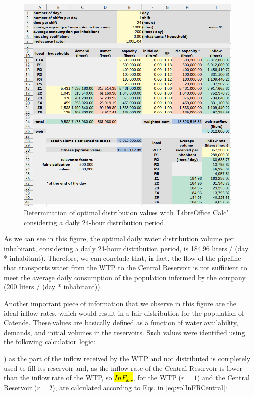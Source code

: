 \documentclass{singlecol}
\theoremstyle{TH}{
\newtheorem{lemma}{Lemma}
\newtheorem{theorem}[lemma]{Theorem}
\newtheorem{corrolary}[lemma]{Corrolary}
\newtheorem{conjecture}[lemma]{Conjecture}
\newtheorem{proposition}[lemma]{Proposition}
\newtheorem{claim}[lemma]{Claim}
\newtheorem{stheorem}[lemma]{Wrong Theorem}
\newtheorem{algorithm}{Algorithm}
}
\theoremstyle{THrm}{
\newtheorem{definition}{Definition}[section]
\newtheorem{question}{Question}[section]
\newtheorem{remark}{Remark}
\newtheorem{scheme}{Scheme}
}
\theoremstyle{THhit}{
\newtheorem{case}{Case}[section]
}
\begin{document}
\begin{figure}[h]
	\begin{center}
	    \caption{Determination of optimal distribution values with 'LibreOffice Calc', considering a daily 24-hour distribution period.}
		\label{fig:evalOptimalValues}
		\centering
		\includegraphics[width=\textwidth]{figures/evalCase01.png}
	\end{center}
\end{figure}

As we can see in this figure, the optimal daily water distribution volume per inhabitant, considering a daily 24-hour distribution period, is 184.96 liters / (day * inhabitant). Therefore, we can conclude that, in fact, the flow of the pipeline that transports water from the WTP to the Central Reservoir is not sufficient to meet the average daily consumption of the population informed by the company (200 liters / (day * inhabitant)).

Another important piece of information that we observe in this figure are the ideal inflow rates, which would result in a fair distribution for the population of Catende. These values are basically defined as a function of water availability, demands, and initial volumes in the reservoirs. Such values were identified using the following calculation logic:

) as the part of the inflow received by the WTP and not distributed is completely used to fill its reservoir and, as the inflow rate of the Central Reservoir is lower than the inflow rate of the WTP, so \hl{$InF_{dsr}$}, for the WTP ($r=1$) and the Central Reservoir  ($r=2$), are calculated according to Eqs. in \ref{eq:volInFRCentral}: 
\end{document}
